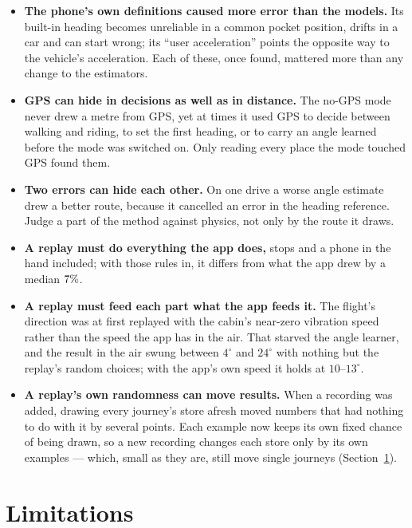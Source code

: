 \documentclass[11pt]{article}
\newcommand{\dg}{^\circ}
\begin{document}
\begin{itemize}
\item \textbf{The phone's own definitions caused more error than the models.} Its built-in heading
becomes unreliable in a common pocket position, drifts in a car and can start wrong; its ``user
acceleration'' points the opposite way to the vehicle's acceleration. Each of these, once found,
mattered more than any change to the estimators.
\item \textbf{GPS can hide in decisions as well as in distance.} The no-GPS mode never drew a metre from
GPS, yet at times it used GPS to decide between walking and riding, to set the first heading, or to
carry an angle learned before the mode was switched on. Only reading every place the mode touched GPS
found them.
\item \textbf{Two errors can hide each other.} On one drive a worse angle estimate drew a better route,
because it cancelled an error in the heading reference. Judge a part of the method against physics,
not only by the route it draws.
\item \textbf{A replay must do everything the app does,} stops and a phone in the hand included; with
those rules in, it differs from what the app drew by a median $7\%$.
\item \textbf{A replay must feed each part what the app feeds it.} The flight's direction was at first
replayed with the cabin's near-zero vibration speed rather than the speed the app has in the air. That
starved the angle learner, and the result in the air swung between $4\dg$ and $24\dg$ with nothing but
the replay's random choices; with the app's own speed it holds at $10$--$13\dg$.
\item \textbf{A replay's own randomness can move results.} When a recording was added, drawing every
journey's store afresh moved numbers that had nothing to do with it by several points. Each example now
keeps its own fixed chance of being drawn, so a new recording changes each store only by its own
examples --- which, small as they are, still move single journeys (Section~\ref{sec:limits}).
\end{itemize}

\section{Limitations}\label{sec:limits}
\end{document}
